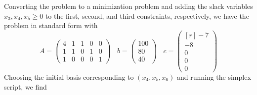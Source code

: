 \documentclass{article}
\begin{document}
\begin{itemize}
\begin{center}
    \end{center}
    Converting the problem to a minimization problem and adding the slack variables  $x_3,x_4,x_5 \geq 0$ to the first, second, and third constraints, respectively, we have the problem in standard form with
    \[A = \begin{pmatrix*}
        4 & 1 & 1 & 0 & 0\\
        1 & 1 & 0 & 1 & 0\\
        1 & 0 & 0 & 0 & 1
    \end{pmatrix*}
    \:\:\:\:
    b = \begin{pmatrix}
        100\\
        80\\
        40
    \end{pmatrix}
    \:\:\:\:
    c = \begin{pmatrix*}[r]
        -7\\
        -8\\
        0\\
        0\\
        0
    \end{pmatrix*}
    \]
    Choosing the initial basis corresponding to $(x_4,x_5,x_6)$ and running the simplex script, we find
    \begin{center}

\end{center}
\end{itemize}
\end{document}
